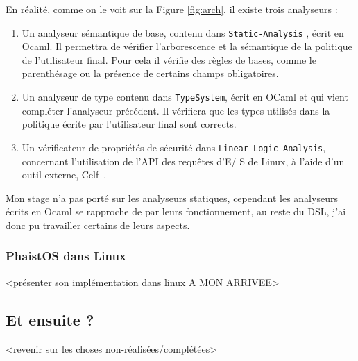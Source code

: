 En réalité, comme on le voit sur la Figure \ref{fig:arch}, il existe trois 
analyseurs : 
\begin{enumerate}
    \item Un analyseur sémantique de base, contenu dans \texttt{Static-Analysis}
    , écrit en Ocaml. Il permettra de vérifier l'arborescence et la sémantique 
    de la politique de l'utilisateur final. Pour cela il vérifie des règles de 
    bases, comme le parenthésage ou la présence de certains champs obligatoires.
    \item Un analyseur de type contenu dans \texttt{TypeSystem}, écrit en OCaml 
    et qui vient compléter l'analyseur précédent. Il vérifiera que les types 
    utilisés dans la politique écrite par l'utilisateur final sont corrects.
    \item Un vérificateur de propriétés de sécurité dans \texttt
    {Linear-Logic-Analysis}, concernant l'utilisation de l'API des requêtes d'E/
    S de Linux, à l'aide d'un outil externe, Celf~\cite{schack2008celf}.
\end{enumerate}
Mon stage n'a pas porté sur les analyseurs statiques, cependant les analyseurs 
écrits en Ocaml se rapproche de par leurs fonctionnement, au reste du DSL, j'ai 
donc pu travailler certains de leurs aspects.


\subsubsection{PhaistOS dans Linux}

<présenter son implémentation dans linux A MON ARRIVEE>

\subsection{Et ensuite ?}

<revenir sur les choses non-réalisées/complétées>

